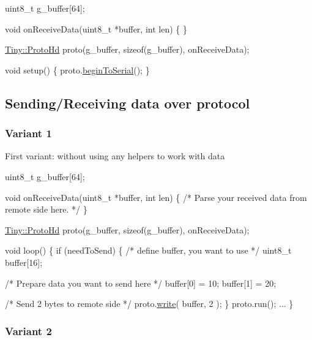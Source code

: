 \begin{DoxyCode}
uint8\_t g\_buffer[64];

\textcolor{keywordtype}{void} onReceiveData(uint8\_t *buffer, \textcolor{keywordtype}{int} len)
\{
\}

\hyperlink{classTiny_1_1ProtoHd}{Tiny::ProtoHd} proto(g\_buffer, \textcolor{keyword}{sizeof}(g\_buffer), onReceiveData);

\textcolor{keywordtype}{void} setup()
\{
    proto.\hyperlink{classTiny_1_1Proto_a1dcad822337b6155148b1da9222fdd82}{beginToSerial}();
\}
\end{DoxyCode}
\hypertarget{arduino_arduino_tiny_hd_send_receive}{}\subsection{Sending/\+Receiving data over protocol}\label{arduino_arduino_tiny_hd_send_receive}
\hypertarget{arduino_arduino_tiny_hd_send_receive1}{}\subsubsection{Variant 1}\label{arduino_arduino_tiny_hd_send_receive1}
First variant\+: without using any helpers to work with data 
\begin{DoxyCode}
uint8\_t g\_buffer[64];

\textcolor{keywordtype}{void} onReceiveData(uint8\_t *buffer, \textcolor{keywordtype}{int} len)
\{
    \textcolor{comment}{/* Parse your received data from remote side here. */}
\}

\hyperlink{classTiny_1_1ProtoHd}{Tiny::ProtoHd} proto(g\_buffer, \textcolor{keyword}{sizeof}(g\_buffer), onReceiveData);

\textcolor{keywordtype}{void} loop()
\{
    \textcolor{keywordflow}{if} (needToSend)
    \{
        \textcolor{comment}{/* define buffer, you want to use */}
        uint8\_t buffer[16];

        \textcolor{comment}{/* Prepare data you want to send here */}
        buffer[0] = 10;
        buffer[1] = 20;

        \textcolor{comment}{/* Send 2 bytes to remote side */}
        proto.\hyperlink{classTiny_1_1Proto_a46fbc8b8681431b9b0a9a4b953a8dc33}{write}( buffer, 2 );
    \}
    proto.run();
    ...
\}
\end{DoxyCode}
\hypertarget{arduino_arduino_tiny_hd_send_receive2}{}\subsubsection{Variant 2}\label{arduino_arduino_tiny_hd_send_receive2}
